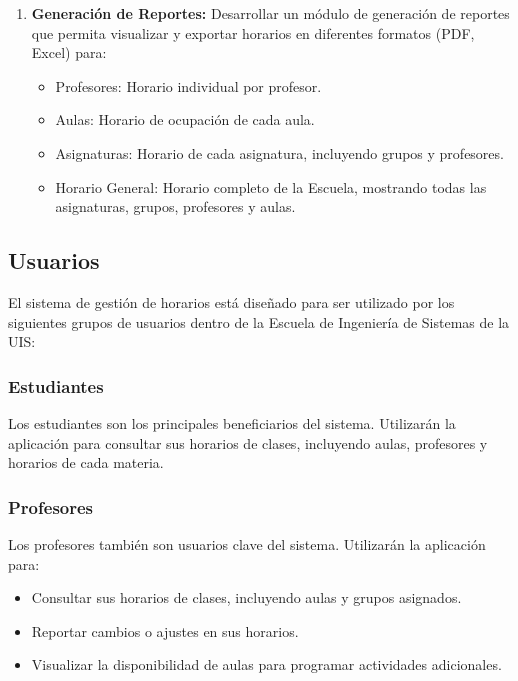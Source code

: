 \documentclass{article} %
\begin{document}
\begin{enumerate}[font=\bfseries]
\begin{itemize}
        \end{itemize}
        \item \textbf{Generación de Reportes:} Desarrollar un módulo de generación de reportes que permita visualizar y exportar horarios en diferentes formatos (PDF, Excel) para:
        \begin{itemize}
            \item Profesores: Horario individual por profesor.
            \item Aulas: Horario de ocupación de cada aula.
            \item Asignaturas: Horario de cada asignatura, incluyendo grupos y profesores.
            \item Horario General: Horario completo de la Escuela, mostrando todas las asignaturas, grupos, profesores y aulas.
        \end{itemize}
    \end{enumerate}
    
\subsection{Usuarios}
\noindent
El sistema de gestión de horarios está diseñado para ser utilizado por los siguientes grupos de usuarios dentro de la Escuela de Ingeniería de Sistemas de la UIS:
    \subsubsection{Estudiantes}
    \noindent
    Los estudiantes son los principales beneficiarios del sistema. Utilizarán la aplicación para consultar sus horarios de clases, incluyendo aulas, profesores y horarios de cada materia. 
    
    \subsubsection{Profesores}
    \noindent
    Los profesores también son usuarios clave del sistema. Utilizarán la aplicación para:
    \begin{itemize}
        \item Consultar sus horarios de clases, incluyendo aulas y grupos asignados.
        \item Reportar cambios o ajustes en sus horarios.
        \item Visualizar la disponibilidad de aulas para programar actividades adicionales.
    \end{itemize}
    
\end{document}
